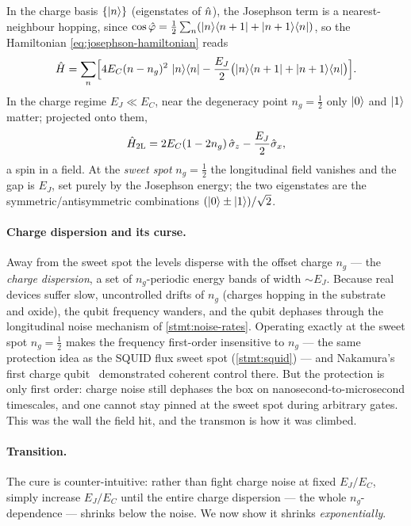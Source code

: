 \begin{statement}
\label{stmt:cpb}
In the charge basis $\{\ket n\}$ (eigenstates of $\hat{n}$), the
Josephson term is a nearest-neighbour hopping, since
$\cos\hat{\varphi}=\tfrac12\sum_n(\ket{n}\!\bra{n+1}+\ket{n+1}\!\bra{n})$,
so the Hamiltonian \cref{eq:josephson-hamiltonian} reads
\begin{equation}
\label{eq:cpb-hamiltonian}
\hat{H} = \sum_n\Bigl[4E_C(n-n_g)^2\,\ket n\!\bra n
  - \frac{E_J}{2}\bigl(\ket{n}\!\bra{n+1}+\ket{n+1}\!\bra{n}\bigr)\Bigr].
\end{equation}
In the charge regime $E_J\ll E_C$, near the degeneracy point
$n_g=\tfrac12$ only $\ket0$ and $\ket1$ matter; projected onto them,
\begin{equation}
\label{eq:cpb-twolevel}
\hat{H}_{\rm 2L} = 2E_C(1-2n_g)\,\hat\sigma_z - \frac{E_J}{2}\hat\sigma_x,
\end{equation}
a spin in a field. At the \emph{sweet spot} $n_g=\tfrac12$ the
longitudinal field vanishes and the gap is $E_J$, set purely by the
Josephson energy; the two eigenstates are the symmetric/antisymmetric
combinations $(\ket0\pm\ket1)/\sqrt2$.
\end{statement}

\paragraph{Charge dispersion and its curse.}
Away from the sweet spot the levels disperse with the offset charge
$n_g$ --- the \emph{charge dispersion}, a set of $n_g$-periodic energy
bands of width $\sim E_J$. Because real devices suffer slow,
uncontrolled drifts of $n_g$ (charges hopping in the substrate and
oxide), the qubit frequency wanders, and the qubit dephases through the
longitudinal noise mechanism of \cref{stmt:noise-rates}. Operating
exactly at the sweet spot $n_g=\tfrac12$ makes the frequency
first-order insensitive to $n_g$ --- the same protection idea as the
SQUID flux sweet spot (\cref{stmt:squid}) --- and Nakamura's first
charge qubit~\cite{nakamura1999} demonstrated coherent control there.
But the protection is only first order: charge noise still dephases the
box on nanosecond-to-microsecond timescales, and one cannot stay
pinned at the sweet spot during arbitrary gates. This was the wall the
field hit, and the transmon is how it was climbed.

\paragraph{Transition.}
The cure is counter-intuitive: rather than fight charge noise at fixed
$E_J/E_C$, simply increase $E_J/E_C$ until the entire charge dispersion
--- the whole $n_g$-dependence --- shrinks below the noise. We now show
it shrinks \emph{exponentially}.


